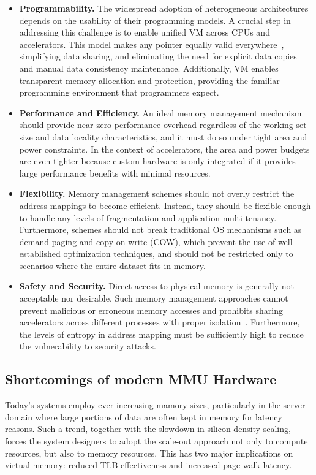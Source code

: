 \begin{itemize}
        \item \textbf{Programmability.} The widespread adoption of heterogeneous architectures depends on the usability of their programming models. A crucial step in addressing this challenge is to enable unified VM across CPUs and accelerators. This model makes any pointer equally valid everywhere~\cite{hsa}, simplifying data sharing, and eliminating the need for explicit data copies and manual data consistency maintenance. Additionally, VM enables transparent memory allocation and protection, providing the familiar programming environment that programmers expect.
        \item \textbf{Performance and Efficiency.} An ideal memory management mechanism should provide near-zero performance overhead regardless of the working set size and data locality characteristics, and it must do so under tight area and power constraints. In the context of accelerators, the area and power budgets are even tighter because custom hardware is only integrated if it provides large performance benefits with minimal resources.
        \item \textbf{Flexibility.} Memory management schemes should not overly restrict the address mappings to become efficient. Instead, they should be flexible enough to handle any levels of fragmentation and application multi-tenancy. Furthermore, schemes should not break traditional OS mechanisms such as demand-paging and copy-on-write (COW), which prevent the use of well-established optimization techniques, and should not be restricted only to scenarios where the entire dataset fits in memory.
        \item \textbf{Safety and Security.} Direct access to physical memory is generally not acceptable nor desirable. Such memory management approaches cannot prevent malicious or erroneous memory accesses and prohibits sharing accelerators across different processes with proper isolation~\cite{haria:devirtualizing}. Furthermore, the levels of entropy in address mapping  must be sufficiently high to reduce the vulnerability to security attacks.
\end{itemize}


\subsection{Shortcomings of modern MMU Hardware}
Today's systems employ ever increasing mamory sizes, particularly in the server domain where large portions of data are often kept in memory for latency reasons. Such a trend, together with the slowdown in silicon density scaling, forces the system designers to adopt the scale-out approach not only to compute resources, but also to memory resources. This has two major implications on virtual memory: reduced TLB effectiveness and increased page walk latency. 

